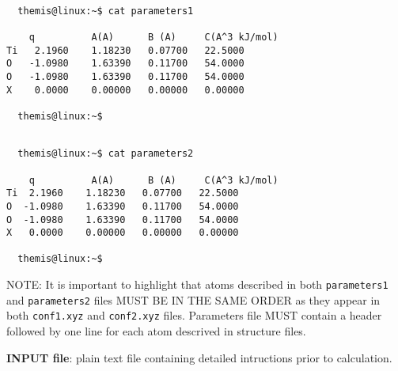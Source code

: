 \documentclass{achemso}
\begin{document}
\begin{center}
  \begin{minipage}{0.425\textwidth}
    \vskip0.25cm
    \begin{verbatim}

  themis@linux:~$ cat parameters1

    q          A(A)      B (A)     C(A^3 kJ/mol)
Ti   2.1960    1.18230   0.07700   22.5000
O   -1.0980    1.63390   0.11700   54.0000
O   -1.0980    1.63390   0.11700   54.0000
X    0.0000    0.00000   0.00000   0.00000

  themis@linux:~$

    \end{verbatim}
  \end{minipage}%
%
  \hskip0.75cm
%
  \begin{minipage}{0.425\textwidth}
    \vskip0.25cm
    \begin{verbatim}

  themis@linux:~$ cat parameters2

    q          A(A)      B (A)     C(A^3 kJ/mol)
Ti  2.1960    1.18230   0.07700   22.5000
O  -1.0980    1.63390   0.11700   54.0000
O  -1.0980    1.63390   0.11700   54.0000
X   0.0000    0.00000   0.00000   0.00000

  themis@linux:~$

    \end{verbatim}
  \end{minipage}%
\end{center}

  NOTE: It is important to highlight that atoms described in both \texttt{parameters1}
and \texttt{parameters2} files MUST BE IN THE SAME ORDER as they appear in both 
\texttt{conf1.xyz} and \texttt{conf2.xyz} files. Parameters file MUST contain a 
header followed by one line for each atom descrived in structure files.


\newpage
\textbf{INPUT file}: plain text file containing detailed intructions prior to
calculation. 
\end{document}
